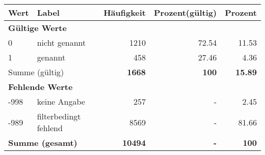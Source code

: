      \begin{longtable}{lXrrr}
     \toprule
     \textbf{Wert} & \textbf{Label} & \textbf{Häufigkeit} & \textbf{Prozent(gültig)} & \textbf{Prozent} \\
     \endhead
     \midrule
     \multicolumn{5}{l}{\textbf{Gültige Werte}}\\

     0 &
     \multicolumn{1}{X}{ nicht genannt   } &


       \num{1210} &
       \num[round-mode=places,round-precision=2]{72,54} &
         \num[round-mode=places,round-precision=2]{11,53} \\

     1 &
     \multicolumn{1}{X}{ genannt   } &


       \num{458} &
       \num[round-mode=places,round-precision=2]{27,46} &
         \num[round-mode=places,round-precision=2]{4,36} \\
     \midrule
     \multicolumn{2}{l}{Summe (gültig)} &
       \textbf{\num{1668}} &
     \textbf{100} &
       \textbf{\num[round-mode=places,round-precision=2]{15,89}} \\
     \multicolumn{5}{l}{\textbf{Fehlende Werte}}\\
       -998 &
       keine Angabe &
         \num{257} &
        - &
         \num[round-mode=places,round-precision=2]{2,45} \\
       -989 &
       filterbedingt fehlend &
         \num{8569} &
        - &
         \num[round-mode=places,round-precision=2]{81,66} \\
     \midrule
     \multicolumn{2}{l}{\textbf{Summe (gesamt)}} &
          \textbf{\num{10494}} &
        \textbf{-} &
        \textbf{100} \\
     \bottomrule
     \end{longtable}
     
